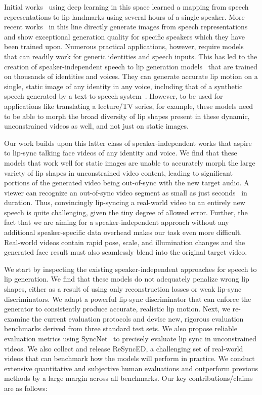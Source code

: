 \documentclass[sigconf]{acmart}
\begin{document}
Initial works~\cite{kumar2017obamanet,suwajanakorn2017synthesizing} using deep learning in this space learned a mapping from speech representations to lip landmarks using several hours of a single speaker. More recent works~\cite{fried2019text,thies2019neural} in this line directly generate images from speech representations and show exceptional generation quality for specific speakers which they have been trained upon. Numerous practical applications, however, require models that can readily work for generic identities and speech inputs. This has led to the creation of speaker-independent speech to lip generation models~\cite{jamaludin2019you,kr2019towards} that are trained on thousands of identities and voices. They can generate accurate lip motion on a single, static image of any identity in any voice, including that of a synthetic speech generated by a text-to-speech system~\cite{kr2019towards}. However, to be used for applications like translating a lecture/TV series, for example, these models need to be able to morph the broad diversity of lip shapes present in these dynamic, unconstrained videos as well, and not just on static images. 

Our work builds upon this latter class of speaker-independent works that aspire to lip-sync talking face videos of any identity and voice. We find that these models that work well for static images are unable to accurately morph the large variety of lip shapes in unconstrained video content, leading to significant portions of the generated video being out-of-sync with the new target audio. A viewer can recognize an out-of-sync video segment as small as just  seconds~\cite{Chung16a} in duration. Thus, convincingly lip-syncing a real-world video to an entirely new speech is quite challenging, given the tiny degree of allowed error. Further, the fact that we are aiming for a speaker-independent approach without any additional speaker-specific data overhead makes our task even more difficult. Real-world videos contain rapid pose, scale, and illumination changes and the generated face result must also seamlessly blend into the original target video. 

We start by inspecting the existing speaker-independent approaches for speech to lip generation. We find that these models do not adequately penalize wrong lip shapes, either as a result of using only reconstruction losses or weak lip-sync discriminators. We adapt a powerful lip-sync discriminator that can enforce the generator to consistently produce accurate, realistic lip motion. Next, we re-examine the current evaluation protocols and devise new, rigorous evaluation benchmarks derived from three standard test sets. We also propose reliable evaluation metrics using SyncNet~\cite{Chung16a} to precisely evaluate lip sync in unconstrained videos. We also collect and release ReSyncED, a challenging set of real-world videos that can benchmark how the models will perform in practice. We conduct extensive quantitative and subjective human evaluations and outperform previous methods by a large margin across all benchmarks. Our key contributions/claims are as follows:
\end{document}
